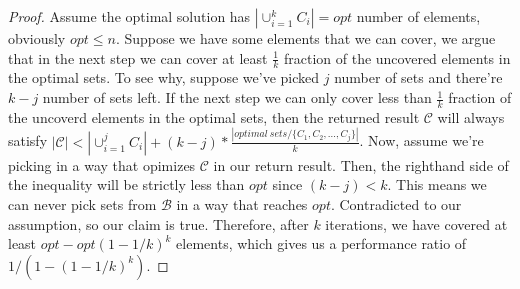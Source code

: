 \documentclass[11pt]{article}
\begin{document}
\newpage

\begin{proof}
	\noindent Assume the optimal solution has $|\cup_{i=1}^{k}C_i| = opt$ number of elements, obviously $opt \leq n$.
	Suppose we have some elements that we can cover, we argue that in the next step we can cover at least $\frac{1}{k}$ fraction of the uncovered elements in the optimal sets.
	To see why, suppose we've picked $j$ number of sets and there're $k-j$ number of sets left.
	If the next step we can only cover less than $\frac{1}{k}$ fraction of the uncoverd elements in the optimal sets, then the returned result $\mathcal{C}$ will always satisfy $|\mathcal{C}| < |\cup_{i=1}^{j}C_i| + (k-j) * \frac{|optimal~sets/\{C_1, C_2, \dots, C_j\}|}{k}$.
	Now, assume we're picking in a way that opimizes $\mathcal{C}$ in our return result.
	Then, the righthand side of the inequality will be strictly less than $opt$ since $(k-j) < k$.
	This means we can never pick sets from $\mathcal{B}$ in a way that reaches $opt$.
	Contradicted to our assumption, so our claim is true.
	Therefore, after $k$ iterations, we have covered at least $opt - opt(1 - 1/k)^k$ elements, which gives us a performance ratio of $1/(1 - (1 - 1/k)^k)$.
\end{proof}

\newpage
\end{document}
